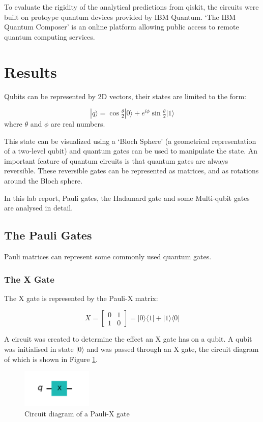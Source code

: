 To evaluate the rigidity of the analytical predictions from qiskit, the circuits were built on protoype quantum devices provided by IBM Quantum. `The IBM Quantum Composer' is an online platform allowing public access to remote quantum computing services.


\section{Results}
Qubits can be represented by 2D vectors, their states are limited to the form:

$$ |q\rangle = \cos{\tfrac{\theta}{2}}|0\rangle + e^{i\phi}\sin{\tfrac{\theta}{2}}|1\rangle $$
where $\theta$ and $\phi$ are real numbers. 

This state can be visualized using a `Bloch Sphere' (a geometrical representation of a two-level qubit) and quantum gates can be used to manipulate the state. An important feature of quantum circuits is that quantum gates are always reversible. These reversible gates can be represented as matrices, and as rotations around the Bloch sphere.

In this lab report, Pauli gates, the Hadamard gate and some Multi-qubit gates are analysed in detail.

\subsection{The Pauli Gates}
Pauli matrices can represent some commonly used quantum gates. 

\subsubsection{The X Gate}
The X gate is represented by the Pauli-X matrix:

$$ X = \begin{bmatrix} 0 & 1 \\ 1 & 0 \end{bmatrix} = |0\rangle\langle1| + |1\rangle\langle0| $$

A circuit was created to determine the effect an X gate has on a qubit. A qubit was initialised in state $|0\rangle$ and was passed through an X gate, the circuit diagram of which is shown in Figure \ref{fig:xGate}.

\begin{figure}[h]
    \centering
    \includegraphics[width=0.3\textwidth]{lab2/images/xGate.png}
    \caption{Circuit diagram of a Pauli-X gate} 
    \label{fig:xGate}
\end{figure}

